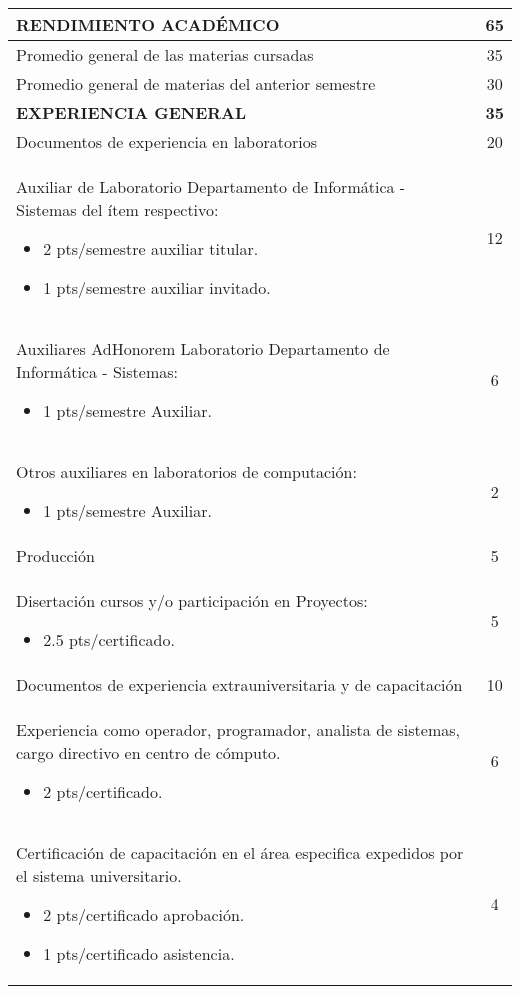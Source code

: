 \documentclass[letterpaper,11pt]{article}
\begin{document}
\begin{tabular}{|p{14cm}|c|}
\hline
\textbf{RENDIMIENTO ACADÉMICO} & \textbf{65} \\
\hline
Promedio general de las materias cursadas & 35 \\
Promedio general de materias del anterior semestre & 30 \\
\hline
\textbf{EXPERIENCIA GENERAL} & \textbf{35} \\
\hline
Documentos de experiencia en laboratorios & 20 \\
Auxiliar de Laboratorio Departamento de Informática - Sistemas del ítem respectivo:
\begin{itemize}
\item 2 pts/semestre auxiliar titular.
\item 1 pts/semestre auxiliar invitado.
\end{itemize} & 12 \\
Auxiliares AdHonorem Laboratorio Departamento de Informática - Sistemas:
\begin{itemize}
\item 1 pts/semestre Auxiliar.
\end{itemize} & 6 \\
Otros auxiliares en laboratorios de computación:
\begin{itemize}
\item 1 pts/semestre Auxiliar.
\end{itemize} & 2 \\
\hline
Producción & 5 \\
\hline
Disertación cursos y/o participación en  Proyectos:
\begin{itemize}
\item 2.5 pts/certificado.
\end{itemize} & 5 \\
\hline
Documentos de experiencia extrauniversitaria y de capacitación & 10 \\
\hline
Experiencia como operador, programador, analista de sistemas, cargo directivo en centro de cómputo.
\begin{itemize}
\item 2 pts/certificado.
\end{itemize} & 6 \\
\hline
Certificación de capacitación en el área especifica expedidos por el sistema universitario.
\begin{itemize}
\item 2 pts/certificado aprobación.
\item 1 pts/certificado asistencia.
\end{itemize} & 4 \\
\hline
\end{tabular}
\end{document}

